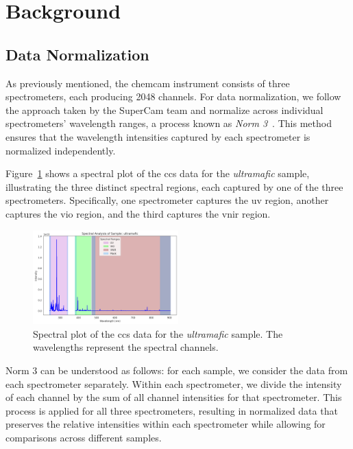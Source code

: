 \section{Background}\label{sec:background}
\subsection{Data Normalization}\label{sec:data_normalization}
As previously mentioned, the \gls{chemcam} instrument consists of three spectrometers, each producing 2048 channels.
For data normalization, we follow the approach taken by the SuperCam team and normalize across individual spectrometers' wavelength ranges, a process known as \textit{Norm 3}~\cite{andersonPostlandingMajorElement2022}.
This method ensures that the wavelength intensities captured by each spectrometer is normalized independently.

Figure~\ref{fig:spectral_plot} shows a spectral plot of the \gls{ccs} data for the \textit{ultramafic} sample, illustrating the three distinct spectral regions, each captured by one of the three spectrometers. Specifically, one spectrometer captures the \gls{uv} region, another captures the \gls{vio} region, and the third captures the \gls{vnir} region.

\begin{figure}[H]
	\centering
	\includegraphics[width=0.5\textwidth]{images/spectral_plot.png}
	\caption{Spectral plot of the \gls{ccs} data for the \textit{ultramafic} sample. The wavelengths represent the spectral channels.}
	\label{fig:spectral_plot}
\end{figure}

Norm 3 can be understood as follows: for each sample, we consider the data from each spectrometer separately. Within each spectrometer, we divide the intensity of each channel by the sum of all channel intensities for that spectrometer. This process is applied for all three spectrometers, resulting in normalized data that preserves the relative intensities within each spectrometer while allowing for comparisons across different samples.

